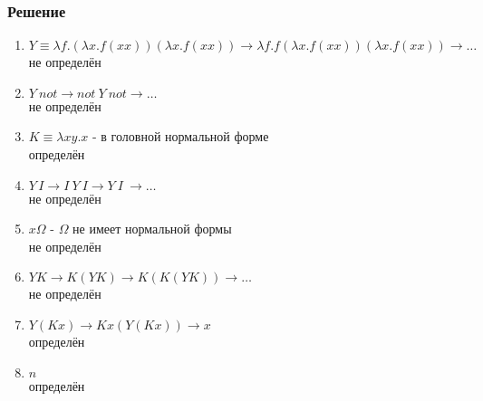 \documentclass[10pt,a4paper]{article}
\begin{document}
\subsubsection*{Решение}
\begin{enumerate}
\item
$Y \equiv \lambda f.(\lambda x.f(xx))(\lambda x.f(xx)) \rightarrow
\lambda f.f(\lambda x.f(xx))(\lambda x.f(xx)) \rightarrow \ldots $\\
не определён
\item
$Y\ not \rightarrow not\ Y\ not \rightarrow \ldots$ \\
не определён
\item
$K \equiv \lambda xy.x$ - в головной нормальной форме\\
определён
\item
$Y\,I \rightarrow I\ Y\ I \rightarrow Y\ I\ \rightarrow \ldots$\\
не определён
\item
$x \Omega $ - $\Omega$ не имеет нормальной формы\\
не определён
\item
$YK \rightarrow K(YK) \rightarrow K(K(YK)) \rightarrow \ldots  $\\
не определён
\item
$Y(Kx) \rightarrow Kx(Y(Kx)) \rightarrow x$\\
определён
\item
$n$ \\
определён
\end{enumerate}
\end{document}
